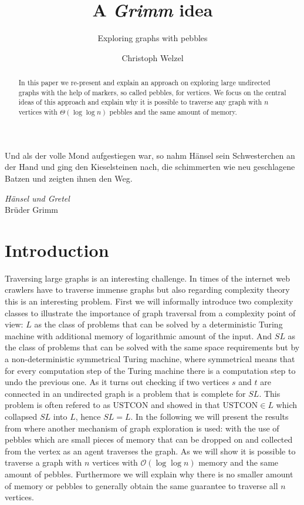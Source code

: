 \documentclass[draft,oneside]{scrartcl}
\begin{document}
\setlength{\epigraphwidth}{0.7\textwidth}

\title{A \emph{Grimm} idea}
\subtitle{Exploring graphs with pebbles}
\author{Christoph Welzel}
\maketitle

\begin{abstract}
  In this paper we re-present and explain an approach on exploring large
  undirected graphs with the help of markers, so called pebbles, for vertices.
  We focus on the central ideas of this approach and explain why it is possible
  to traverse any graph with $n$ vertices with $\Theta(\log \log n)$ pebbles
  and the same amount of memory.
\end{abstract}

\epigraph{Und als der volle Mond aufgestiegen war, so nahm Hänsel sein %
Schwesterchen an der Hand und ging den Kieselsteinen nach, die schimmerten %
wie neu geschlagene Batzen und zeigten ihnen den Weg.}%
{\emph{Hänsel und Gretel}\\Brüder Grimm}

\section{Introduction}
Traversing large graphs is an interesting challenge. In times of the internet
web crawlers have to traverse immense graphs but also regarding complexity
theory this is an interesting problem. First we will informally introduce two
complexity classes to illustrate the importance of graph traversal from a
complexity point of view: $L$ as the class of problems that can be solved by
a deterministic Turing machine with additional memory of logarithmic amount
of the input. And $SL$ as the class of problems that can be solved with the
same space requirements but by a non-deterministic symmetrical Turing machine,
where symmetrical means that for every computation step of the Turing machine
there is a computation step to undo the previous one. As it turns out checking
if two vertices $s$ and $t$ are connected in an undirected graph is a problem
that is complete for $SL$. This problem is often refered to as
$\mathrm{USTCON}$ and \citeauthor{logspacealg} showed in \cite{logspacealg}
that $\mathrm{USTCON}\in L$ which collapsed $SL$ into $L$, hence $SL = L$.
In the following we will present the results from \cite{pebbles} where another
mechanism of graph exploration is used: with the use of pebbles which are small
pieces of memory that can be dropped on and collected from the vertex as an
agent traverses the graph. As we will show it is possible to traverse a graph
with $n$ vertices with $\mathcal{O}(\log\log n)$ memory and the same amount of
pebbles. Furthermore we will explain why there is no smaller amount of memory
or pebbles to generally obtain the same guarantee to traverse all $n$ vertices.
\end{document}
